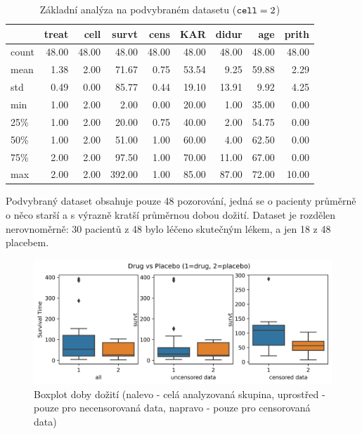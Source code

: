 \documentclass[a4, 11pt]{article}
\theoremstyle{definition}
\theoremstyle{remark}
\begin{document}
\begin{table}[H]
	\centering
	\begin{tabular}{lrrrrrrrr}
		\toprule
		& treat & cell & survt & cens & KAR & didur & age & prith \\
		\midrule
		count & 48.00 & 48.00 & 48.00 & 48.00 & 48.00 & 48.00 & 48.00 & 48.00 \\
		mean & 1.38 & 2.00 & 71.67 & 0.75 & 53.54 & 9.25 & 59.88 & 2.29 \\
		std & 0.49 & 0.00 & 85.77 & 0.44 & 19.10 & 13.91 & 9.92 & 4.25 \\
		min & 1.00 & 2.00 & 2.00 & 0.00 & 20.00 & 1.00 & 35.00 & 0.00 \\
		25\% & 1.00 & 2.00 & 20.00 & 0.75 & 40.00 & 2.00 & 54.75 & 0.00 \\
		50\% & 1.00 & 2.00 & 51.00 & 1.00 & 60.00 & 4.00 & 62.50 & 0.00 \\
		75\% & 2.00 & 2.00 & 97.50 & 1.00 & 70.00 & 11.00 & 67.00 & 0.00 \\
		max & 2.00 & 2.00 & 392.00 & 1.00 & 85.00 & 87.00 & 72.00 & 10.00 \\
		\bottomrule
	\end{tabular}
	\caption{Základní analýza na podvybraném datasetu ($\mbox{\texttt{cell}}=2$)}
    \label{tab:analyza_muj_dataset}
\end{table}
	
	Podvybraný dataset obsahuje pouze 48 pozorování, jedná se o pacienty průměrně o něco starší a s výrazně kratší průměrnou dobou dožití. Dataset je rozdělen nerovnoměrně: 30 pacientů z 48 bylo léčeno skutečným lékem, a jen 18 z 48 placebem. 
	
	\begin{figure}[H]
		\centering
		\includegraphics[width=0.999\linewidth]{img/boxplot_drug_vs_placebo_BOTH}
		\caption[Boxplot doby dožití]{Boxplot doby dožití (nalevo - celá analyzovaná skupina, uprostřed - pouze pro necensorovaná data, napravo - pouze pro censorovaná data)}
		\label{fig:boxplotdrugvsplacebo}
	\end{figure}
\end{document}

